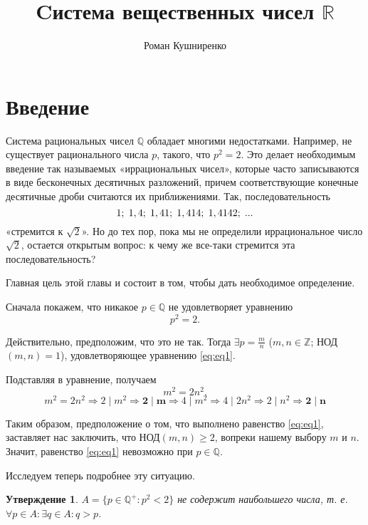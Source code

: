 \documentclass{article}
\title{Cистема вещественных чисел \(\mathbb{R}\)}
\author{Роман Кушниренко}
\newtheorem{claim}{Утверждение}[section]
\begin{document}
	\maketitle
	
	\section{Введение}

Система рациональных чисел \(\mathbb{Q}\) обладает многими недостатками. Например, не существует рационального числа \(p\), такого, что \(p^2=2\). Это делает необходимым введение так называемых «иррациональных чисел», которые часто записываются в виде бесконечных десятичных разложений, причем соответствующие конечные десятичные дроби считаются их приближениями. Так, последовательность	
\[
1; \hspace{1mm} 1,4; \hspace{1mm} 1,41; \hspace{1mm} 1,414; \hspace{1mm} 1,4142; \hspace{1mm} ...
\]
«стремится к \(\sqrt{2}\)». Но до тех пор, пока мы не определили 
иррациональное число \(\sqrt{2}\), остается открытым вопрос: к чему же все-таки стремится эта последовательность?

Главная цель этой главы и состоит в том, чтобы дать необходимое определение.\newline

Сначала покажем, что никакое \(p \in \mathbb{Q}\) не удовлетворяет уравнению
\[
p^2=2. \tag{1} \label{eq:eq1}
\]

Действительно, предположим, что это не так. Тогда \(\exists p = \frac{m}{n}\) (\(m,n \in \mathbb{Z}\); НОД\((m, n) = 1\)), удовлетворяющее уравнению \eqref{eq:eq1}.

Подставляя в уравнение, получаем
\[
m^2=2n^2.
\]
\[
m^2=2n^2 \Rightarrow 2 \mid m^2 \Rightarrow \mathbf{2 \mid m} \Rightarrow 4 \mid m^2 \Rightarrow 4 \mid 2n^2 \Rightarrow 2 \mid n^2 \Rightarrow \mathbf{2 \mid n}
\]

Таким образом, предположение о том, что выполнено равенство \eqref{eq:eq1}, заставляет нас заключить, что НОД\((m, n) \geq 2\),
вопреки нашему выбору \(m\) и \(n\). Значит, равенство \eqref{eq:eq1} невозможно при \(p \in \mathbb{Q}\).\newline

Исследуем теперь подробнее эту ситуацию.

\begin{claim}
\(A=\{p \in \mathbb{Q^{+}} : p^2 < 2\}\) не содержит наибольшего числа, т. е. \(\forall p \in A : \exists q \in A : q > p\).
\end{claim}
\end{document}

